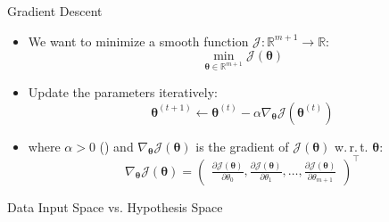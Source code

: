 \begin{frame}{Gradient Descent}{}\important
	\begin{itemize}
		\item We want to minimize a smooth function $\mathcal{J} : \mathbb{R}^{m+1} \rightarrow \mathbb{R}$:
		\begin{equation*}
			\min_{\bm{\theta} \in \mathbb{R}^{m+1}} \mathcal{J}(\bm{\theta})
		\end{equation*}
		\item Update the parameters iteratively:
		\begin{equation}
			\bm{\theta}^{(t+1)} \longleftarrow \bm{\theta}^{(t)} -
				\alpha \nabla_{\bm{\theta}} \mathcal{J}(\bm{\theta}^{(t)})
		\end{equation}
		\item where $\alpha > 0$ () and $\nabla_{\bm{\theta}} \mathcal{J}(\bm{\theta})$
			is the gradient of $\mathcal{J}(\bm{\theta})$ w.\,r.\,t. $\bm{\theta}$:
		\begin{equation*}
			\nabla_{\bm{\theta}} \mathcal{J}(\bm{\theta}) = 
			\begin{pmatrix}
				\frac{\partial \mathcal{J}(\bm{\theta})}{\partial \theta_0},
				\frac{\partial \mathcal{J}(\bm{\theta})}{\partial \theta_1}, 
				\dots,
				\frac{\partial \mathcal{J}(\bm{\theta})}{\partial \theta_{m+1}}
			\end{pmatrix}^{\intercal}
		\end{equation*}
	\end{itemize}
\end{frame}


\begin{frame}{Data Input Space vs. Hypothesis Space}{}
\end{frame}


